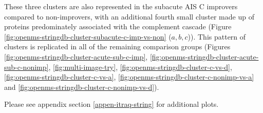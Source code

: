 \documentclass[9pt,lineno]{elife}
\begin{document}
These three clusters are also represented in the subacute AIS C improvers compared to non-improvers, with an additional fourth small cluster made up of proteins predominately associated with the complement cascade (Figure \ref{fig:openms-stringdb-cluster-subacute-c-imp-vs-non} (\(a,b,c\))).
This pattern of clusters is replicated in all of the remaining comparison groups (Figures \ref{fig:openms-stringdb-cluster-acute-sub-c-imp}, \ref{fig:openms-stringdb-cluster-acute-sub-c-nonimp}, \ref{fig:multi-image-try}, \ref{fig:openms-stringdb-cluster-c-vs-d}, \ref{fig:openms-stringdb-cluster-c-vs-a}, \ref{fig:openms-stringdb-cluster-c-nonimp-vs-a} and \ref{fig:openms-stringdb-cluster-c-nonimp-vs-d}).

Please see appendix section \ref{appen-itraq-string} for additional plots.

\clearpage
\end{document}
